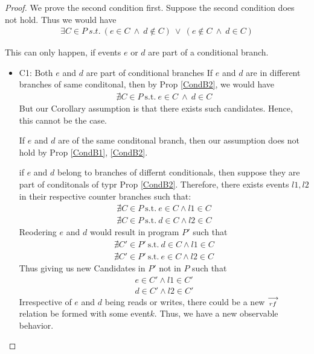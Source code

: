     \begin{proof}
      
        
        We prove the second condition first. 
        Suppose the second condition does not hold. Thus we would have
        \begin{align*}
            \exists C \in P \ s.t. \ 
            (e \in C \ \wedge \ d \notin C) \ \vee \ 
            (e \notin C \ \wedge \ d \in C)
        \end{align*}
        
        This can only happen, if events $e$ or $d$ are part of a conditional branch.
        \begin{itemize}
            \item C1: Both $e$ and $d$ are part of conditional branches
                If $e$ and $d$ are in different branches of same conditonal, then by Prop \ref{CondB2}, we would have 
                \begin{align*}
                    \nexists C \in P \ \text{s.t.} \ e \in C \ \wedge \ d \in C 
                \end{align*}
                But our Corollary assumption is that there exists such candidates. Hence, this cannot be the case.
                
                If $e$ and $d$ are of the same conditonal branch, then our assumption does not hold by Prop \ref{CondB1}, \ref{CondB2}. 

                if $e$ and $d$ belong to branches of differnt conditionals, then suppose they are part of conditonals of typr Prop \ref{CondB2}. Therefore, there exists events $l1, l2$ in their respective counter branches such that:
                \begin{align*}
                    \nexists C \in P \ \text{s.t.} \ e \in C \wedge l1 \in C \\ 
                    \nexists C \in P \ \text{s.t.} \ d \in C \wedge l2 \in C 
                \end{align*} 
                Reodering $e$ and $d$ would result in program $P'$ such that
                \begin{align*}
                    \nexists C' \in P' \ \text{s.t.} \ d \in C \wedge l1 \in C \\ 
                    \nexists C' \in P' \ \text{s.t.} \ e \in C \wedge l2 \in C  
                \end{align*}  
                Thus giving us new Candidates in $P'$ not in $P$ such that 
                \begin{align*}
                    e \in C' \wedge l1 \in C' \\ 
                    d \in C' \wedge l2 \in C'
                \end{align*}
                Irrespective of $e$ and $d$ being reads or writes, there could be a new $\stackrel{\longrightarrow}{_{rf}}$ relation be formed with some event$k$. Thus, we have a new observable behavior. 
                

\end{itemize}
\end{proof}
